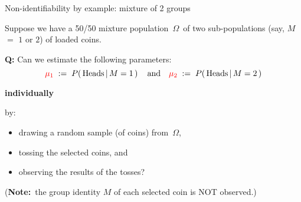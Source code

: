 \begin{frame}{\vskip -0.2cm \large Non-identifiability by example: {\Large mixture of 2 groups}}

\mbox{}
\vskip -0.5cm

\pause
Suppose we have a 50/50 mixture population \,$\Omega$\, of two
sub-populations (say, $M$ $=$ $1$ or $2$) of loaded coins.

\pause
\vskip 0.3cm
\textbf{Q:}\; {\color{red}Can we estimate} the following parameters:
\begin{equation*}
{\color{red}\mu_{1}} \;:=\; P\!\left(\,\textnormal{Heads}\,\vert\,M=1\,\right)
\quad\textnormal{and}\quad
{\color{red}\mu_{2}} \;:=\; P\!\left(\,\textnormal{Heads}\,\vert\,M=2\,\right)
\end{equation*}
\pause
\begin{center} \vskip-0.8cm \textbf{\Large\color{red}individually} \end{center}
\vskip -0.3cm
by:
\pause
\begin{itemize}
\item
	drawing a random sample (of coins) from \,$\Omega$,
\item
	tossing the selected coins, and
\item
	observing the results of the tosses?
\end{itemize}

\pause
\vskip 0.3cm
({\small\textbf{Note:}\, the group identity $M$ of each selected coin is NOT observed.})

\end{frame}
\normalsize

